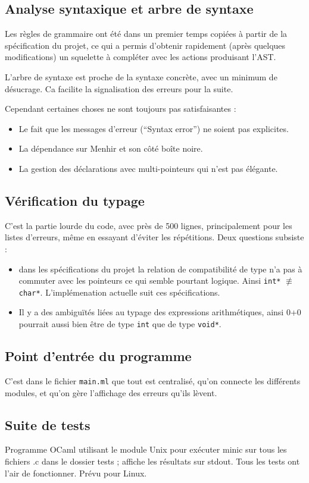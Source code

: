 \documentclass[a4paper, 11pt]{article}
\begin{document}
\subsection{Analyse syntaxique et arbre de syntaxe}

Les règles de grammaire ont été dans un premier temps copiées à partir de la
spécification du projet, ce qui a permis d'obtenir rapidement (après quelques modifications)
un squelette à compléter avec les actions produisant l'AST.

L'arbre de syntaxe est proche de la syntaxe concrète, avec un minimum de désucrage.
Ca facilite la signalisation des erreurs pour la suite.

Cependant certaines choses ne sont toujours pas satisfaisantes : 
\begin{itemize}
\item Le fait que les messages d'erreur (``Syntax error'') ne soient pas explicites.
\item La dépendance sur Menhir et son côté boîte noire.
\item La gestion des déclarations avec multi-pointeurs qui n'est pas élégante.
\end{itemize}


\subsection{Vérification du typage}

C'est la partie lourde du code, avec près de 500 lignes, principalement pour les listes d'erreurs, même en essayant d'éviter les répétitions. 
Deux questions subsiste :
\begin{itemize}
\item dans les spécifications du projet la relation de compatibilité de type n'a pas
  à commuter avec les pointeurs ce qui semble pourtant logique. Ainsi \texttt{int*}
  $\not\equiv$ \texttt{char*}. L'implémenation actuelle suit ces spécifications.
\item Il y a des ambiguïtés liées au typage des expressions arithmétiques, ainsi
  0+0 pourrait aussi bien être de type \texttt{int} que de type \texttt{void*}.
\end{itemize}

\subsection{Point d'entrée du programme}

C'est dans le fichier \texttt{main.ml} que tout est centralisé, qu'on connecte
les différents modules, et qu'on gère l'affichage des erreurs qu'ils lèvent.


\subsection{Suite de tests}

Programme OCaml utilisant le module Unix pour exécuter minic sur tous les fichiers .c
dans le dossier tests ; affiche les résultats sur stdout.
Tous les tests ont l'air de fonctionner.
Prévu pour Linux.
\end{document}

